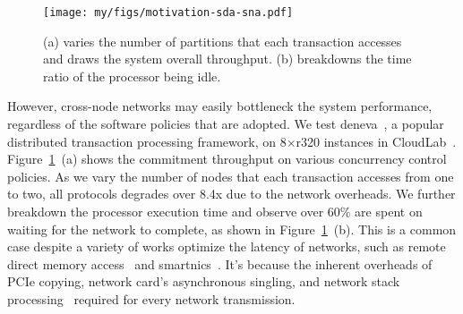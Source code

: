 \begin{figure}[t]
  \texttt{[image: my/figs/motivation-sda-sna.pdf]}
  \caption{
  (a) varies the number of partitions that each transaction accesses and draws the system overall throughput. (b) breakdowns the time ratio of the processor being idle. 
   }
  \label{fig:sna-sda}
\end{figure}





However, cross-node networks may easily bottleneck the system performance, regardless of the software policies that are adopted. 
We test deneva~\cite{dbx1000_dist_vldb17, abyss_vldb14}, a popular distributed transaction processing framework, on 8$\times$r320 instances in CloudLab~\cite{cloudlab}. 
Figure~\ref{fig:sna-sda}~(a) shows the commitment throughput on various concurrency control policies. As we vary the number of nodes that each transaction accesses from one to two, all protocols degrades over 8.4x due to the network overheads. We further breakdown the processor execution time and observe over 60\% are spent on waiting for the network to complete, as shown in Figure~\ref{fig:sna-sda}~(b). This is a common case despite a variety of works optimize the latency of networks, such as remote direct memory access~\cite{ddio_ispass20, ddio-doc, farm_nsdi14, myth_vldb17, xenic_sosp21, ipipe_sigcomm19, linefs_sosp21} and smartnics~\cite{xenic_sosp21, clio_asplos22}. It's because the inherent overheads of PCIe copying, network card's asynchronous singling, and network stack processing~\cite{directcxl} required for every network transmission. 

